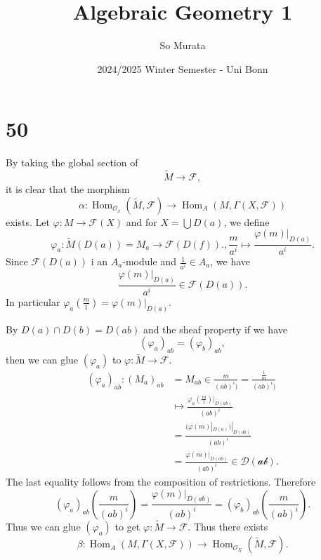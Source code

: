 \documentclass{article}
\title{Algebraic Geometry 1}
\author{So Murata}
\date{2024/2025 Winter Semester - Uni Bonn}
\numberwithin{equation}{section}
\DeclareMathOperator{\Hom}{Hom}
\begin{document}
\maketitle
\section*{50}

By taking the global section of 
\begin{equation*}
\tilde{M}\to\mathscr{F},
\end{equation*}
it is clear that the morphism
\begin{equation*}
\alpha:\Hom_{\mathcal{O}_x}(\tilde{M},\mathscr{F})\to\Hom_A(M,\Gamma(X,\mathscr{F}))
\end{equation*}
exists. Let $\varphi:M\to\mathscr{F}(X)$ and for $X=\bigcup D(a)$, we define
\begin{equation*}
\varphi_a:\tilde{M}(D(a))=M_a\to\mathscr{F}(D(f))., {\frac m {a^i}} \mapsto {\frac {\varphi(m)|_{D(a)}} {a^i}}.
\end{equation*}
Since $\mathscr{F}(D(a))$ i an $A_a$-module and ${\frac 1 {a^i}}\in A_a$, we have 
\begin{equation*}
{\frac {\varphi(m)|_{D(a)}} {a^i}}\in\mathscr{F}(D(a)).
\end{equation*}
In particular $\varphi_a({\frac m 1}) = \varphi(m)|_{D(a)}$.\\
\par By $D(a)\cap D(b) = D(ab)$ and the sheaf property if we have
\begin{equation*}
(\varphi_a)_{ab} = (\varphi_b)_{ab},
\end{equation*}
then we can glue $(\varphi_a)$ to $\varphi:\tilde{M}\to\mathscr{F}$. 
\begin{align*}
(\varphi_a)_{ab}:(M_a)_{ab} &= M_{ab} \in{\frac m {(ab)^i)}} = {\frac {{\frac 1 m}} {(ab)^i)}}\\
&\mapsto {\frac {\varphi_a({\frac m 1})|_{D(ab)}} {(ab)^i}}\\
& = {\frac {(\varphi(m)|_{D(a)})|_{D(ab)}} {(ab)^i}}\\
& = {\frac {\varphi(m)|_{D(ab)}} {(ab)^i}}\in\mathscr{D(ab)}.
\end{align*}
The last equality follows from the composition of restrictions. Therefore
\begin{equation*}
(\varphi_a)_{ab}\left({\frac m {(ab)^i}}\right) = {\frac {\varphi(m)|_{D(ab)}} {(ab)^i}} = (\varphi_b)_{ab}\left({\frac m {(ab)^i}}\right).
\end{equation*}
Thus we can glue $(\varphi_a)$ to get $\varphi:\tilde{M}\to\mathscr{F}$. Thus there exists
\begin{equation*}
\beta:\Hom_A(M,\Gamma(X,\mathscr{F}))\to\Hom_{\mathcal{O}_X}(\tilde{M},\mathscr{F}).
\end{equation*}
\end{document}
